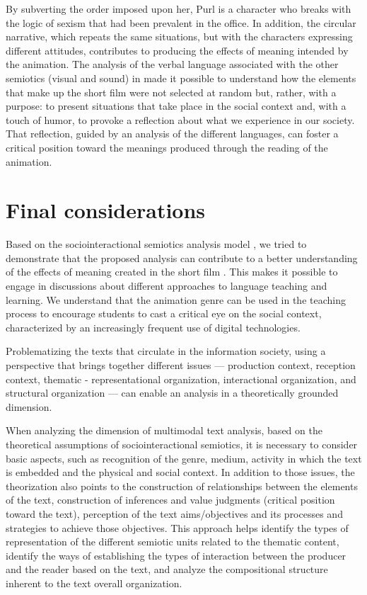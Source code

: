\documentclass[english]{textolivre}
\begin{document}
By subverting the order imposed upon her, Purl is a character who breaks with the logic of sexism that had been prevalent in the office. In addition, the circular narrative, which repeats the same situations, but with the characters expressing different attitudes, contributes to producing the effects of meaning intended by the animation. The analysis of the verbal language associated with the other semiotics (visual and sound) in \textcite{purl} made it possible to understand how the elements that make up the short film were not selected at random but, rather, with a purpose: to present situations that take place in the social context and, with a touch of humor, to provoke a reflection about what we experience in our society. That reflection, guided by an analysis of the different languages, can foster a critical position toward the meanings produced through the reading of the animation. 



\section{Final considerations}

Based on the sociointeractional semiotics analysis model \cite{leal2011organizaccao}, we tried to demonstrate that the proposed analysis can contribute to a better understanding of the effects of meaning created in the short film \textcite{purl}. This makes it possible to engage in discussions about different approaches to language teaching and learning. We understand that the animation genre can be used in the teaching process to encourage students to cast a critical eye on the social context, characterized by an increasingly frequent use of digital technologies.

Problematizing the texts that circulate in the information society, using a perspective that brings together different issues — production context, reception context, thematic - representational organization, interactional organization, and structural organization — can enable an analysis in a theoretically grounded dimension. 

When analyzing the dimension of multimodal text analysis, based on the theoretical assumptions of sociointeractional semiotics, it is necessary to consider basic aspects, such as recognition of the genre, medium, activity in which the text is embedded and the physical and social context. In addition to those issues, the theorization also points to the construction of relationships between the elements of the text, construction of inferences and value judgments (critical position toward the text), perception of the text aims/objectives and its processes and strategies to achieve those objectives. This approach helps identify the types of representation of the different semiotic units related to the thematic content, identify the ways of establishing the types of interaction between the producer and the reader based on the text, and analyze the compositional structure inherent to the text overall organization.
\end{document}
